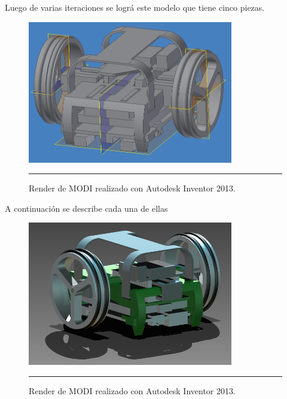 Luego de varias iteraciones se lográ este modelo que tiene cinco piezas. 


\begin{figure}[htbp]
	\centering
		\includegraphics[width=0.8\textwidth]{./Figures/MODI/modi.png}
		\rule{35em}{0.5pt}
	\caption[Render]{Render de MODI realizado con Autodesk Inventor 2013.}
	\label{fig:MODIInventor}
\end{figure}

A continuación se describe cada una de ellas 

\begin{figure}[htbp]
	\centering
		\includegraphics[width=0.8\textwidth]{./Figures/MODI/render2.png}
		\rule{35em}{0.5pt}
	\caption[Render]{Render de MODI realizado con Autodesk Inventor 2013.}
	\label{fig:render2}
\end{figure}	



